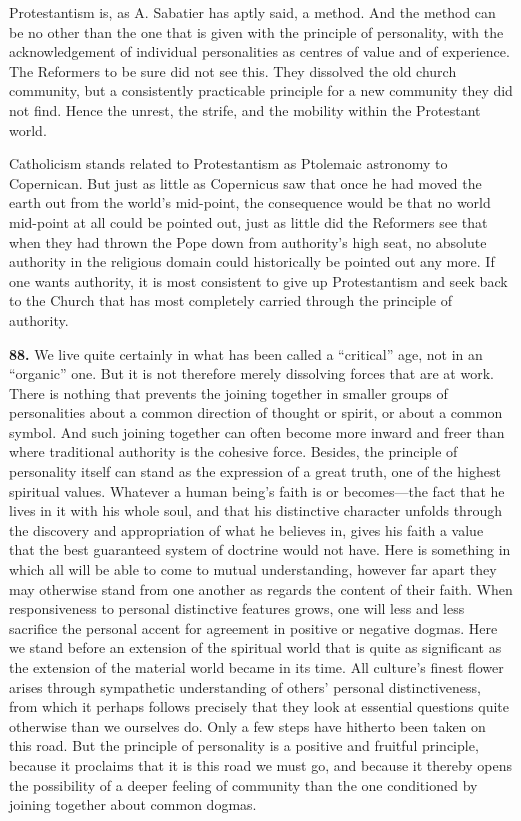 \documentclass[12pt,a4paper]{book}
\newcommand{\opage}[1]{\marginnote{\footnotesize\textit{[#1]}}}
\begin{document}
Protestantism is, as A. Sabatier has aptly said, a method. And the method can be no other than the one
that is given with the principle of personality, with the acknowledgement of individual personalities
as centres of value and of experience. The Reformers to be sure did not see this. They dissolved the
old church community, but a consistently practicable principle for a new community they did not find.
Hence the unrest, the strife, and the mobility within the Protestant world.

\opage{203}Catholicism stands related to Protestantism as Ptolemaic astronomy to Copernican. But just as little as
Copernicus saw that once he had moved the earth out from the world's mid-point, the consequence would
be that no world mid-point at all could be pointed out, just as little did the Reformers see that when
they had thrown the Pope down from authority's high seat, no absolute authority in the religious domain
could historically be pointed out any more. If one wants authority, it is most consistent to give up
Protestantism and seek back to the Church that has most completely carried through the principle of
authority.

\medskip

\noindent\textbf{88.} We live quite certainly in what has been called a ``critical'' age, not in an
``organic'' one. But it is not therefore merely dissolving forces that are at work. There is nothing
that prevents the joining together in smaller groups of personalities about a common direction of
thought or spirit, or about a common symbol. And such joining together can often become more inward and
freer than where traditional authority is the cohesive force. Besides, the principle of personality
itself can stand as the expression of a great truth, one of the highest spiritual values. Whatever a
human being's faith is or becomes---the fact that he lives in it with his whole soul, and that his
distinctive character unfolds through the discovery and appropriation of what he believes in, gives his
faith a value that the best guaranteed system of doctrine would not have. Here is something in which
all will be able to come to mutual understanding, however far apart they may otherwise stand from one
another as regards the content of their faith. When responsiveness to personal distinctive features
grows, one will less and less sacrifice the personal accent for agreement in positive or negative
dogmas. Here we stand before an extension of the spiritual world that is quite as significant as the
extension of the material world became in its time. All culture's finest flower arises through
sympathetic understanding of others' personal distinctiveness, from which it perhaps follows precisely
that they look at essential questions quite otherwise than we ourselves do. Only a few steps have
hitherto been taken on this road. But the principle of personality is a positive and fruitful principle,
because it proclaims that it is this road we must go, and because it thereby opens the possibility of a
deeper feeling of community than the one conditioned by joining together about common dogmas.
\end{document}
